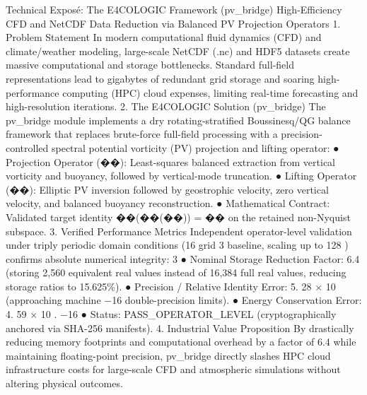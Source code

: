 Technical Exposé: The E4COLOGIC Framework (pv\_bridge) High-Efficiency CFD and NetCDF Data Reduction via Balanced PV Projection Operators 1. Problem Statement In modern computational fluid dynamics (CFD) and climate/weather modeling, large-scale NetCDF (.nc) and HDF5 datasets create massive computational and storage bottlenecks. Standard full-field representations lead to gigabytes of redundant grid storage and soaring high-performance computing (HPC) cloud expenses, limiting real-time forecasting and high-resolution iterations. 2. The E4COLOGIC Solution (pv\_bridge) The pv\_bridge module implements a dry rotating-stratified Boussinesq/QG balance framework that replaces brute-force full-field processing with a precision-controlled spectral potential vorticity (PV) projection and lifting operator: ● Projection Operator (��): Least-squares balanced extraction from vertical vorticity and buoyancy, followed by vertical-mode truncation. ● Lifting Operator (��): Elliptic PV inversion followed by geostrophic velocity, zero vertical velocity, and balanced buoyancy reconstruction. ● Mathematical Contract: Validated target identity ��(��(��)) = �� on the retained non-Nyquist subspace. 3. Verified Performance Metrics Independent operator-level validation under triply periodic domain conditions (16 grid 3 baseline, scaling up to 128 ) confirms absolute numerical integrity: 3 ● Nominal Storage Reduction Factor: 6.4 (storing 2,560 equivalent real values instead of 16,384 full real values, reducing storage ratios to 15.625\%). ● Precision / Relative Identity Error: 5. 28 × 10 (approaching machine −16 double-precision limits). ● Energy Conservation Error: 4. 59 × 10 . −16 ● Status: PASS\_OPERATOR\_LEVEL (cryptographically anchored via SHA-256 manifests). 4. Industrial Value Proposition By drastically reducing memory footprints and computational overhead by a factor of 6.4 while maintaining floating-point precision, pv\_bridge directly slashes HPC cloud infrastructure costs for large-scale CFD and atmospheric simulations without altering physical outcomes.
